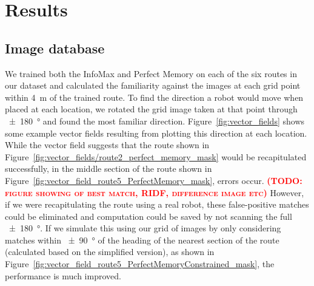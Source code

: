 \documentclass[letterpaper]{article}
\newcommand{\todo}[1]{\textbf{\textsc{\textcolor{red}{(TODO: #1)}}}}
\begin{document}
\section{Results}
\subsection{Image database}
We trained both the InfoMax and Perfect Memory on each of the six routes in our dataset and calculated the familiarity against the images at each grid point within \SI{4}{\metre} of the trained route. 
To find the direction a robot would move when placed at each location, we rotated the grid image taken at that point through \SI{\pm 180}{\degree} and found the most familiar direction. 
Figure~\ref{fig:vector_fields} shows some example vector fields resulting from plotting this direction at each location. 
While the vector field suggests that the route shown in Figure~\ref{fig:vector_fields/route2_perfect_memory_mask} would be recapitulated successfully, in the middle section of the route shown in Figure~\ref{fig:vector_field_route5_PerfectMemory_mask}, errors occur.
\todo{figure showing of best match, RIDF, difference image etc}
However, if we were recapitulating the route using a real robot, these false-positive matches could be eliminated and computation could be saved by not scanning the full \SI{\pm 180}{\degree}. 
If we simulate this using our grid of images by only considering matches within \SI{\pm 90}{\degree} of the heading of the nearest section of the route (calculated based on the simplified version), as shown in Figure~\ref{fig:vector_field_route5_PerfectMemoryConstrained_mask}, the performance is much improved.
\end{document}

